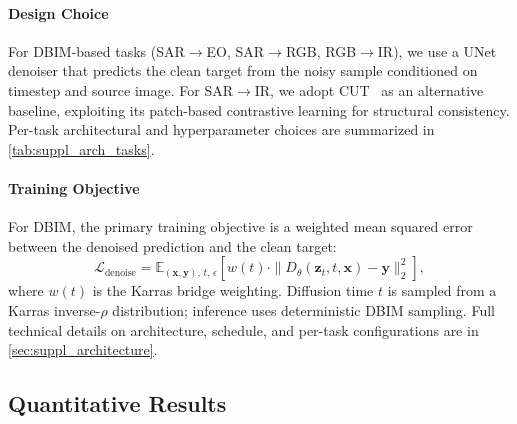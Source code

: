 \paragraph{Design Choice}
For DBIM-based tasks (SAR$\rightarrow$EO, SAR$\rightarrow$RGB, RGB$\rightarrow$IR), we use a UNet~\cite{ronnebergerUNetConvolutionalNetworks2015} denoiser that predicts the clean target from the noisy sample conditioned on timestep and source image. For SAR$\rightarrow$IR, we adopt CUT~\cite{parkContrastiveLearningUnpaired2020} as an alternative baseline, exploiting its patch-based contrastive learning for structural consistency. Per-task architectural and hyperparameter choices are summarized in \cref{tab:suppl_arch_tasks}.

\paragraph{Training Objective}
For DBIM, the primary training objective is a weighted mean squared error between the denoised prediction and the clean target:
\begin{equation}
    \mathcal{L}_{\text{denoise}} = \mathbb{E}_{(\bm{x},\bm{y}),\, t,\, \epsilon} \left[ w(t) \cdot \| D_\theta(\bm{z}_t, t, \bm{x}) - \bm{y} \|_2^2 \right],
    \label{eq:denoising_loss}
\end{equation}
where $w(t)$ is the Karras bridge weighting. Diffusion time $t$ is sampled from a Karras inverse-$\rho$ distribution; inference uses deterministic DBIM sampling. Full technical details on architecture, schedule, and per-task configurations are in \cref{sec:suppl_architecture}.

\subsection{Quantitative Results}
\label{sec:quantitative}

\begin{table}[t]
\centering
\caption{Main results on the MAVIC-T evaluation set. $\downarrow$ lower is better. Time is per-sample inference latency; SAR$\to$EO is run at 256px with large batch size, and its latency is averaged.}
\label{tab:main_results}
\end{table}

